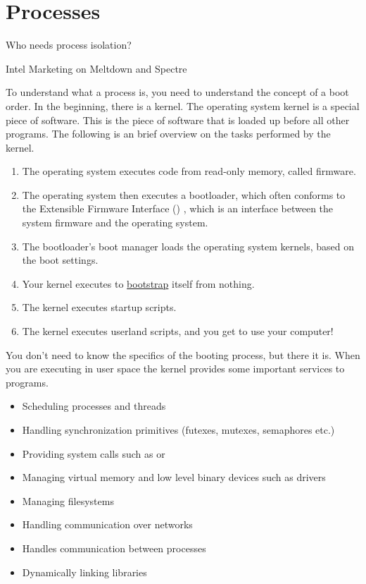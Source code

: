 \chapter{Processes}

\epigraph{Who needs process isolation?}{Intel Marketing on Meltdown and Spectre}

To understand what a process is, you need to understand the concept of a boot order.
In the beginning, there is a kernel.
The operating system kernel is a special piece of software.
This is the piece of software that is loaded up before all other programs.
The following is an brief overview on the tasks performed by the kernel.

\begin{enumerate}
\item
  The operating system executes code from read-only memory, called firmware.
\item
  The operating system then executes a bootloader, which often conforms to the Extensible Firmware Interface () , which is an interface between the system firmware and the operating system.
\item
  The bootloader's boot manager loads the operating system kernels, based on the boot settings.
\item
  Your kernel executes  to \href{https://en.wikipedia.org/wiki/Bootstrapping}{bootstrap} itself from nothing.
\item
  The kernel executes startup scripts.
\item
  The kernel executes userland scripts, and you get to use your computer!
\end{enumerate}

You don't need to know the specifics of the booting process, but there it is.
When you are executing in user space the kernel provides some important services to programs.

\begin{itemize}
\item Scheduling processes and threads
\item Handling synchronization primitives (futexes, mutexes, semaphores etc.)
\item Providing system calls such as  or 
\item Managing virtual memory and low level binary devices such as  drivers
\item Managing filesystems
\item Handling communication over networks
\item Handles communication between processes
\item Dynamically linking libraries
\end{itemize}

